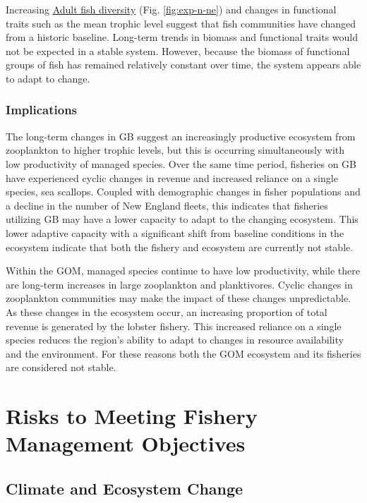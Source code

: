 \documentclass[
  10pt,
]{article}
\begin{document}
Increasing \href{https://noaa-edab.github.io/catalog/exp_n.html}{Adult fish diversity} (Fig. \ref{fig:exp-n-ne}) and changes in functional traits such as the mean trophic level suggest that fish communities have changed from a historic baseline. Long-term trends in biomass and functional traits would not be expected in a stable system. However, because the biomass of functional groups of fish has remained relatively constant over time, the system appears able to adapt to change.

\subsubsection{Implications}\label{implications-5}

The long-term changes in GB suggest an increasingly productive ecosystem from zooplankton to higher trophic levels, but this is occurring simultaneously with low productivity of managed species. Over the same time period, fisheries on GB have experienced cyclic changes in revenue and increased reliance on a single species, sea scallops. Coupled with demographic changes in fisher populations and a decline in the number of New England fleets, this indicates that fisheries utilizing GB may have a lower capacity to adapt to the changing ecosystem. This lower adaptive capacity with a significant shift from baseline conditions in the ecosystem indicate that both the fishery and ecosystem are currently not stable.

Within the GOM, managed species continue to have low productivity, while there are long-term increases in large zooplankton and planktivores. Cyclic changes in zooplankton communities may make the impact of these changes unpredictable. As these changes in the ecosystem occur, an increasing proportion of total revenue is generated by the lobster fishery. This increased reliance on a single species reduces the region's ability to adapt to changes in resource availability and the environment. For these reasons both the GOM ecosystem and its fisheries are considered not stable.

\section{Risks to Meeting Fishery Management Objectives}\label{risks-to-meeting-fishery-management-objectives}

\subsection{Climate and Ecosystem Change}\label{climate-and-ecosystem-change}
\end{document}
